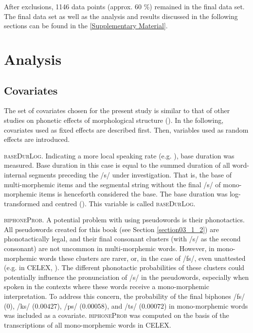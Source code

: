 After exclusions, 1146 data points (approx. 60 \%) remained in the final data set. The final data set as well as the analysis and results discussed in the following sections can be found in the \ref{Supplementary Material}.

\section{Analysis}\label{section04_2}

\subsection{Covariates}\label{section04_2_1}

The set of covariates chosen for the present study is similar to that of other studies on phonetic effects of morphological structure (\cite{Pluymaekers2005a, Pluymaekers2005b, Hanique2013Ernestus, Plag2017}). In the following, covariates used as fixed effects are described first. Then, variables used as random effects are introduced.

\textsc{baseDurLog}. Indicating a more local speaking rate (e.g. \cite{Plag2017}), base duration was measured. Base duration in this case is equal to the summed duration of all word-internal segments preceding the /s/ under investigation. That is, the base of multi-morphemic items and the segmental string without the final /s/ of mono-morphemic items is henceforth considered the base. The base duration was log-transformed and centred (\cite{Robinson2009, Afshartous2011, Winter2019}). This variable is called \textsc{baseDurLog}.

\textsc{biphoneProb}. A potential problem with using pseudowords is their phonotactics. All pseudowords created for this book (see Section \ref{section03_1_2}) are phonotactically legal, and their final consonant clusters (with /s/ as the second consonant) are not uncommon in multi-morphemic words. However, in mono-morphemic words these clusters are rarer, or, in the case of /fs/, even unattested (e.g. in CELEX, \cite{Baayen1995}). The different phonotactic probabilities of these clusters could potentially influence the pronunciation of /s/ in the pseudowords, especially when spoken in the contexts where these words receive a mono-morphemic interpretation. To address this concern, the probability of the final biphones /fs/ ($0$), /ks/ ($0.00427$), /ps/ ($0.00058$), and /ts/ ($0.00072$) in mono-morphemic words was included as a covariate. \textsc{biphoneProb} was computed on the basis of the transcriptions of all mono-morphemic words in CELEX.

